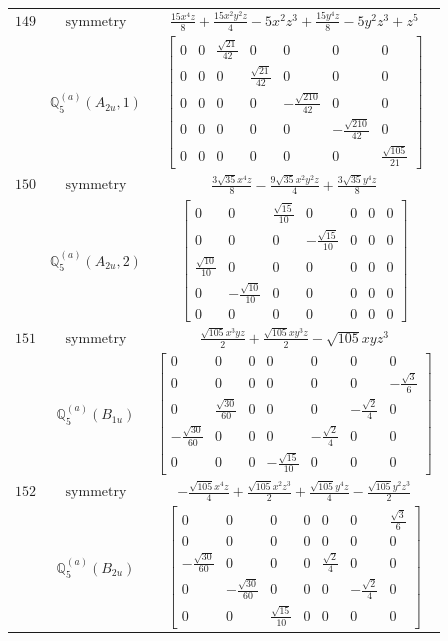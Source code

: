 \documentclass[fleqn,8pt,landscape]{jsarticle}
\begin{document}
\begin{longtable}{ccc}
$ 149 $ & $ \text{symmetry} $ & $ \frac{15 x^{4} z}{8} + \frac{15 x^{2} y^{2} z}{4} - 5 x^{2} z^{3} + \frac{15 y^{4} z}{8} - 5 y^{2} z^{3} + z^{5} $ \\
$  $ & $ \mathbb{Q}_{5}^{(a)}(A_{2u},1) $ & $ \begin{bmatrix} 0 & 0 & \frac{\sqrt{21}}{42} & 0 & 0 & 0 & 0 \\ 0 & 0 & 0 & \frac{\sqrt{21}}{42} & 0 & 0 & 0 \\ 0 & 0 & 0 & 0 & - \frac{\sqrt{210}}{42} & 0 & 0 \\ 0 & 0 & 0 & 0 & 0 & - \frac{\sqrt{210}}{42} & 0 \\ 0 & 0 & 0 & 0 & 0 & 0 & \frac{\sqrt{105}}{21} \end{bmatrix} $ \\ \hline
$ 150 $ & $ \text{symmetry} $ & $ \frac{3 \sqrt{35} x^{4} z}{8} - \frac{9 \sqrt{35} x^{2} y^{2} z}{4} + \frac{3 \sqrt{35} y^{4} z}{8} $ \\
$  $ & $ \mathbb{Q}_{5}^{(a)}(A_{2u},2) $ & $ \begin{bmatrix} 0 & 0 & \frac{\sqrt{15}}{10} & 0 & 0 & 0 & 0 \\ 0 & 0 & 0 & - \frac{\sqrt{15}}{10} & 0 & 0 & 0 \\ \frac{\sqrt{10}}{10} & 0 & 0 & 0 & 0 & 0 & 0 \\ 0 & - \frac{\sqrt{10}}{10} & 0 & 0 & 0 & 0 & 0 \\ 0 & 0 & 0 & 0 & 0 & 0 & 0 \end{bmatrix} $ \\ \hline
$ 151 $ & $ \text{symmetry} $ & $ \frac{\sqrt{105} x^{3} y z}{2} + \frac{\sqrt{105} x y^{3} z}{2} - \sqrt{105} x y z^{3} $ \\
$  $ & $ \mathbb{Q}_{5}^{(a)}(B_{1u}) $ & $ \begin{bmatrix} 0 & 0 & 0 & 0 & 0 & 0 & 0 \\ 0 & 0 & 0 & 0 & 0 & 0 & - \frac{\sqrt{3}}{6} \\ 0 & \frac{\sqrt{30}}{60} & 0 & 0 & 0 & - \frac{\sqrt{2}}{4} & 0 \\ - \frac{\sqrt{30}}{60} & 0 & 0 & 0 & - \frac{\sqrt{2}}{4} & 0 & 0 \\ 0 & 0 & 0 & - \frac{\sqrt{15}}{10} & 0 & 0 & 0 \end{bmatrix} $ \\ \hline
$ 152 $ & $ \text{symmetry} $ & $ - \frac{\sqrt{105} x^{4} z}{4} + \frac{\sqrt{105} x^{2} z^{3}}{2} + \frac{\sqrt{105} y^{4} z}{4} - \frac{\sqrt{105} y^{2} z^{3}}{2} $ \\
$  $ & $ \mathbb{Q}_{5}^{(a)}(B_{2u}) $ & $ \begin{bmatrix} 0 & 0 & 0 & 0 & 0 & 0 & \frac{\sqrt{3}}{6} \\ 0 & 0 & 0 & 0 & 0 & 0 & 0 \\ - \frac{\sqrt{30}}{60} & 0 & 0 & 0 & \frac{\sqrt{2}}{4} & 0 & 0 \\ 0 & - \frac{\sqrt{30}}{60} & 0 & 0 & 0 & - \frac{\sqrt{2}}{4} & 0 \\ 0 & 0 & \frac{\sqrt{15}}{10} & 0 & 0 & 0 & 0 \end{bmatrix} $ \\ \hline

\end{longtable}
\end{document}
